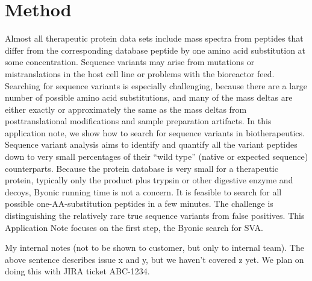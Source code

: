 \documentclass[letterpaper,10pt,oneside,english]{sphinxmanual}
\begin{document}
\section{Method}
\label{\detokenize{applicationnote:method}}
Almost all therapeutic protein data sets include mass spectra from peptides that differ from the corresponding database peptide by one amino acid substitution at some concentration.  Sequence variants may arise from mutations or mistranslations in the host cell line or problems with the bioreactor feed.  Searching for sequence variants is especially challenging, because there are a large number of possible amino acid substitutions, and many of the mass deltas are either exactly or approximately the same as the mass deltas from posttranslational modifications and sample preparation artifacts.  In this application note, we show how to search for sequence variants in biotherapeutics.
Sequence variant analysis aims to identify and quantify all the variant peptides down to very small percentages of their “wild type” (native or expected sequence) counterparts.  Because the protein database is very small for a therapeutic protein, typically only the product plus trypsin or other digestive enzyme and decoys, Byonic running time is not a concern. It is feasible to search for all possible one-AA-substitution peptides in a few minutes.  The challenge is distinguishing the relatively rare true sequence variants from false positives.
This Application Note focuses on the first step, the Byonic search for SVA.




My internal notes (not to be shown to customer, but only to internal team).
The above sentence describes issue x and y, but we haven’t covered z yet. We plan on doing this with JIRA ticket ABC-1234.
\end{document}
